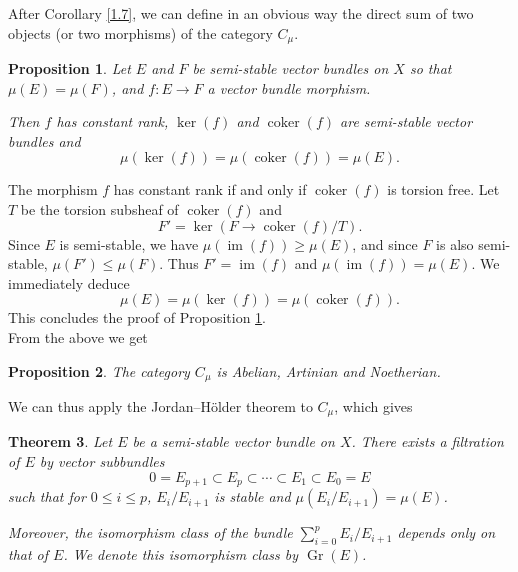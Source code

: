 \documentclass[12pt,a4paper]{book}
\DeclareMathOperator\im{im}
\DeclareMathOperator\coker{coker}
\DeclareMathOperator\Gr{Gr}
\newtheorem{thm}{Theorem}[chapter]
\newtheorem{prop}[thm]{Proposition}
\theoremstyle{definition} \newtheorem{defn}[thm]{Definition}
\theoremstyle{definition} \newtheorem{ejs}[thm]{Examples}
\theoremstyle{definition} \newtheorem{ej}[thm]{Example}
\begin{document}
      After Corollary \ref{1.7}, we can define in an obvious way the direct sum of two objects (or two morphisms) of the category $C_\mu$.

      \begin{prop}\label{1.8}
	Let $E$ and $F$ be semi-stable vector bundles on $X$ so that $\mu(E)=\mu(F)$, and $f:E\rightarrow F$ a vector bundle morphism. 

	Then $f$ has constant rank, $\ker(f)$ and $\coker(f)$ are semi-stable vector bundles and
	\begin{equation*}
	  \mu(\ker(f))=\mu(\coker(f))=\mu(E).
	\end{equation*}
      \end{prop}

      The morphism $f$ has constant rank if and only if $\coker(f)$ is torsion free. Let $T$ be the torsion subsheaf of $\coker(f)$ and
      \begin{equation*}
	F'= \ker(F\rightarrow \coker(f)/T).
      \end{equation*}
      Since $E$ is semi-stable, we have $\mu(\im(f))\geq \mu(E)$, and since $F$ is also semi-stable, $\mu(F')\leq \mu(F)$. Thus $F'=\im(f)$ and $\mu(\im(f))=\mu(E)$. We immediately deduce
      \begin{equation*}
	\mu(E)=\mu(\ker(f))=\mu(\coker(f)).
      \end{equation*}
      This concludes the proof of Proposition \ref{1.8}. \\

      From the above we get
      \begin{prop}\label{1.9}
	The category $C_\mu$ is Abelian, Artinian and Noetherian.
      \end{prop}

      We can thus apply the Jordan--Hölder theorem to $C_\mu$, which gives 

      \begin{thm}\label{1.10}
	Let $E$ be a semi-stable vector bundle on $X$. There exists a filtration of $E$ by vector subbundles
	\begin{equation*}
	  0=E_{p+1} \subset E_p \subset \cdots \subset E_1 \subset E_0=E
	\end{equation*}
	such that for $0\leq i\leq p$, $E_i/E_{i+1}$ is stable and $\mu(E_i/E_{i+1})=\mu(E)$.

	Moreover, the isomorphism class of the bundle $\sum_{i=0}^p E_i/E_{i+1}$ depends only on that of $E$. We denote this isomorphism class by $\Gr(E)$.
      \end{thm}
\end{document}
